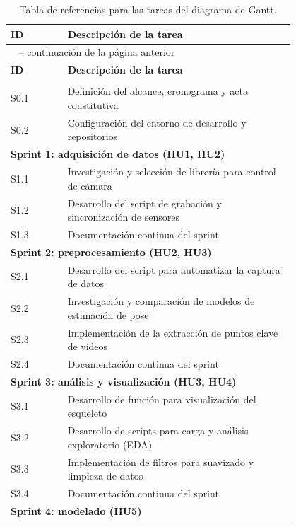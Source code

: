 \documentclass[
11pt, %
]{charter}
\begin{document}
\begin{longtable}{|l|p{0.8\linewidth}|}
\caption{Tabla de referencias para las tareas del diagrama de Gantt.}
\label{tab:gantt_ref_sprints} \\
\hline
\rowcolor{gray}
\textbf{ID} & \textbf{Descripción de la tarea} \\
\hline
\endfirsthead
\multicolumn{2}{l}{\tablename\ \thetable{} -- continuación de la página anterior} \\
\hline
\rowcolor{gray}
\textbf{ID} & \textbf{Descripción de la tarea} \\
\hline
\endhead
\hline
\endfoot
\hline
\endlastfoot

\multicolumn{2}{l}{\textbf{Sprint 0: planificación}} \\
S0.1 & Definición del alcance, cronograma y acta constitutiva \\
S0.2 & Configuración del entorno de desarrollo y repositorios \\ \hline
\multicolumn{2}{l}{\textbf{Sprint 1: adquisición de datos (HU1, HU2)}} \\
S1.1 & Investigación y selección de librería para control de cámara \\
S1.2 & Desarrollo del script de grabación y sincronización de sensores \\
S1.3 & Documentación continua del sprint \\ \hline
\multicolumn{2}{l}{\textbf{Sprint 2: preprocesamiento (HU2, HU3)}} \\
S2.1 & Desarrollo del script para automatizar la captura de datos \\
S2.2 & Investigación y comparación de modelos de estimación de pose \\
S2.3 & Implementación de la extracción de puntos clave de videos \\
S2.4 & Documentación continua del sprint \\ \hline
\multicolumn{2}{l}{\textbf{Sprint 3: análisis y visualización (HU3, HU4)}} \\
S3.1 & Desarrollo de función para visualización del esqueleto \\
S3.2 & Desarrollo de scripts para carga y análisis exploratorio (EDA) \\
S3.3 & Implementación de filtros para suavizado y limpieza de datos \\
S3.4 & Documentación continua del sprint \\ \hline
\multicolumn{2}{l}{\textbf{Sprint 4: modelado (HU5)}} \\

\end{longtable}
\end{document}

